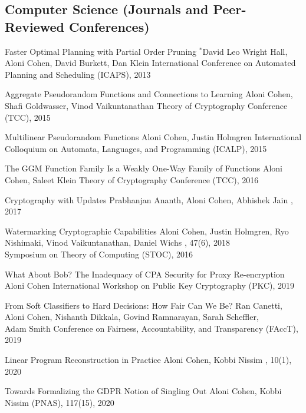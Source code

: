 \subsection{Computer Science (Journals and Peer-Reviewed Conferences)}
\ifnumberpubs
  \begin{enumerate}
\else
  \begin{itemize}[label={}]
\fi


\cvpub%
{Faster Optimal Planning with Partial Order Pruning}%
{$^*$David Leo Wright Hall, Aloni Cohen, David Burkett, Dan Klein}%
{International Conference on Automated Planning and Scheduling (ICAPS), 2013}%
{}%

\cvpub%
{Aggregate Pseudorandom Functions and Connections to Learning}%
{Aloni Cohen, Shafi Goldwasser, Vinod Vaikuntanathan}%
{Theory of Cryptography Conference (TCC), 2015}%
{}%

\cvpub%
{Multilinear Pseudorandom Functions}%
{Aloni Cohen, Justin Holmgren}%
{International Colloquium on Automata, Languages, and Programming (ICALP), 2015}%
{}%

\cvpub%
{The GGM Function Family Is a Weakly One-Way Family of Functions}%
{Aloni Cohen, Saleet Klein}%
{Theory of Cryptography Conference (TCC), 2016}%
{}%

\cvpub%
{Cryptography with Updates}%
{Prabhanjan Ananth, Aloni Cohen, Abhishek Jain}%
{\Eurocrypt, 2017}%
{}

\cvpub%
{Watermarking Cryptographic Capabilities}%
{Aloni Cohen, Justin Holmgren, Ryo Nishimaki, Vinod Vaikuntanathan, Daniel Wichs}%
{, 47(6), 2018 \\
Symposium on Theory of Computing (STOC), 2016}%

\cvpub%
{What About Bob? The Inadequacy of CPA Security for Proxy Re-encryption}%
{Aloni Cohen}%
{International Workshop on Public Key Cryptography (PKC), 2019}%
{}

\cvpub%
{From Soft Classifiers to Hard Decisions: How Fair Can We Be?}%
{Ran Canetti, Aloni Cohen, Nishanth Dikkala, Govind Ramnarayan, Sarah Scheffler, \\Adam Smith}%
{Conference on Fairness, Accountability, and Transparency (FAccT), 2019}%
{}

\cvpub%
{Linear Program Reconstruction in Practice}%
{Aloni Cohen, Kobbi Nissim}%
{, 10(1), 2020}%
{}

\cvpub%
{Towards Formalizing the GDPR Notion of Singling Out}%
{Aloni Cohen, Kobbi Nissim}%
{ (PNAS), 117(15), 2020}%
{}


\end{itemize}
\end{enumerate}
